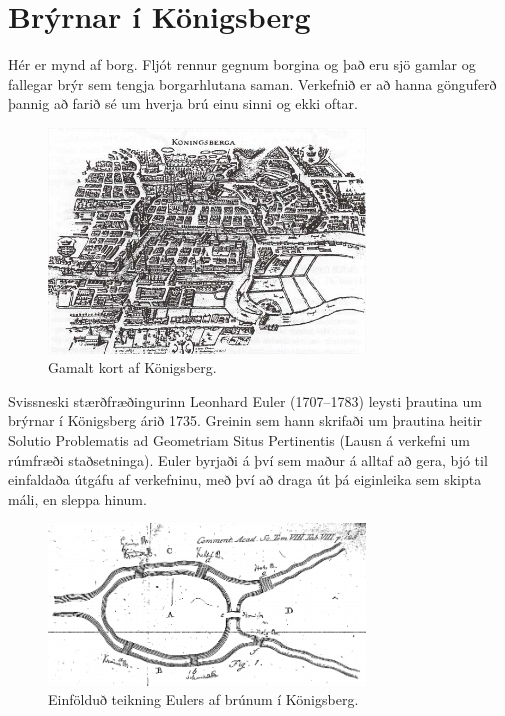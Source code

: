 \documentclass[b5paper,12pt]{book}
\begin{document}



\section{Brýrnar í Königsberg}
Hér er mynd af borg. Fljót rennur gegnum borgina og það eru sjö gamlar og fallegar brýr sem tengja borgarhlutana saman. Verkefnið er að hanna gönguferð þannig að farið sé um hverja brú einu sinni og ekki oftar.  

\begin{figure}[h]
  \includegraphics[width=0.75\textwidth, center]{Myndir/koningbryr.jpg}
  \caption*{Gamalt kort af Königsberg.}
\end{figure}

\noindent
Svissneski stærðfræðingurinn Leonhard Euler (1707–1783) leysti þrautina um brýrnar í Königsberg árið 1735. Greinin sem hann skrifaði um þrautina heitir Solutio Problematis ad Geometriam Situs Pertinentis (Lausn á verkefni um rúmfræði staðsetninga). Euler byrjaði á því sem maður á alltaf að gera, bjó til einfaldaða útgáfu af verkefninu, með því að draga út þá eiginleika sem skipta máli, en sleppa hinum. 

\begin{figure}[h]
  \includegraphics[width=0.75\textwidth, center]{Myndir/konigsb_euler.png}
   \caption*{Einfölduð teikning Eulers af brúnum í Königsberg.}
\end{figure}
\end{document}
